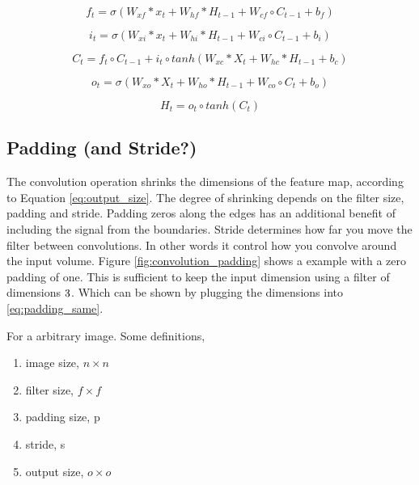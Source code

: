 \documentclass{article}
\begin{document}
\begin{equation} \label{eq:CLSTM2_forget_gate}
        f_t = \sigma \left( W_{xf}*x_t + W_{hf}*H_{t-1} + W_{cf}\circ C_{t-1}+b_f \right)
\end{equation}

\begin{equation} \label{eq:CLSTM1_input_gate}
    i_t = \sigma \left( W_{xi}*x_t + W_{hi}*H_{t-1} + W_{ci}\circ C_{t-1}+b_i \right) 
\end{equation}

\begin{equation} \label{eq:CLSTM3_cellstate}
        C_t = f_t \circ C_{t-1} +i_t\circ tanh\left( W_{xc}*X_t + W_{hc}*H_{t-1} + b_c \right)
\end{equation}

\begin{equation} \label{eq:CLSTM4_output_gate}
        o_t = \sigma \left( W_{xo}*X_t + W_{ho}*H_{t-1} + W_{co}\circ C_{t}+b_o \right)
\end{equation}

\begin{equation} \label{eq:CLSTM5_hidden_state}
        H_t = o_t \circ tanh \left( C_t \right)
\end{equation}

\subsection{Padding (and Stride?)} \label{sec:padding}
The convolution operation shrinks the dimensions of the feature map, according to Equation \eqref{eq:output_size}. The degree of shrinking  depends on the  filter size, padding and stride. Padding zeros along the edges has an additional benefit of including the signal from the boundaries. Stride determines how far you move the filter between convolutions. In other words it control how you convolve around the input volume. Figure \ref{fig:convolution_padding} shows a example with a zero padding of one. This is sufficient to keep the input dimension using a filter of dimensions $3 \time 3$. Which can be shown by plugging the dimensions into \eqref{eq:padding_same}.

For a arbitrary image. Some definitions,
\begin{enumerate}
    \item image size, $n\times n$
    \item filter size, $f\times f$
    \item padding size, p
    \item stride, s
    \item output size, $o \times o$
\end{enumerate}
\end{document}
